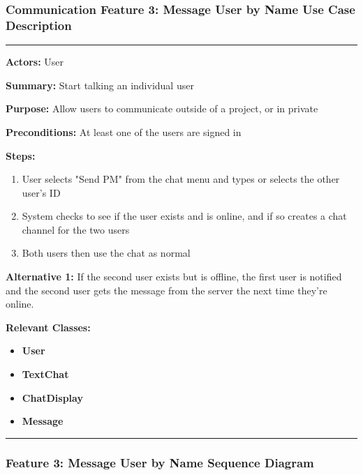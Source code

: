 \documentclass[twoside,letterpaper]{article}
\begin{document}
\newpage

\subsubsection[Communication Feature 3: Message User by Name Use Case Description]{\rmfamily\bfseries\color{black}
	Communication Feature 3: Message User by Name Use Case Description}
\hypertarget{RefHeading22059017292}{}

\vspace{2pt}
\hrule
\vspace{8pt}
\textbf{Actors:} User \newline

\noindent\textbf{Summary:} Start talking an individual user \newline

\noindent\textbf{Purpose:} Allow users to communicate outside of a project, or in private \newline

\noindent\textbf{Preconditions:} At least one of the users are signed in \newline

\noindent\textbf{Steps:} \begin{enumerate}
	\item User selects "Send PM" from the chat menu and types or selects the other user's ID
	\item System checks to see if the user exists and is online, and if so creates a chat channel for the two users
	\item Both users then use the chat as normal
\end{enumerate}
\noindent\textbf{Alternative 1:} If the second user exists but is offline, the first user is notified and the second user gets the message from the server the next time they're online. \newline


\noindent\textbf{Relevant Classes:}
\begin{itemize}
	\item \textbf{User}
	\item \textbf{TextChat}
	\item \textbf{ChatDisplay}
	\item \textbf{Message}
\end{itemize}
\hrule
\newpage

\subsubsection[Communication Feature 3: Message User by Name Sequence Diagram]{\rmfamily\bfseries\color{black}
	Feature 3: Message User by Name Sequence Diagram}
\hypertarget{RefHeading22059017292}{}
\end{document}
